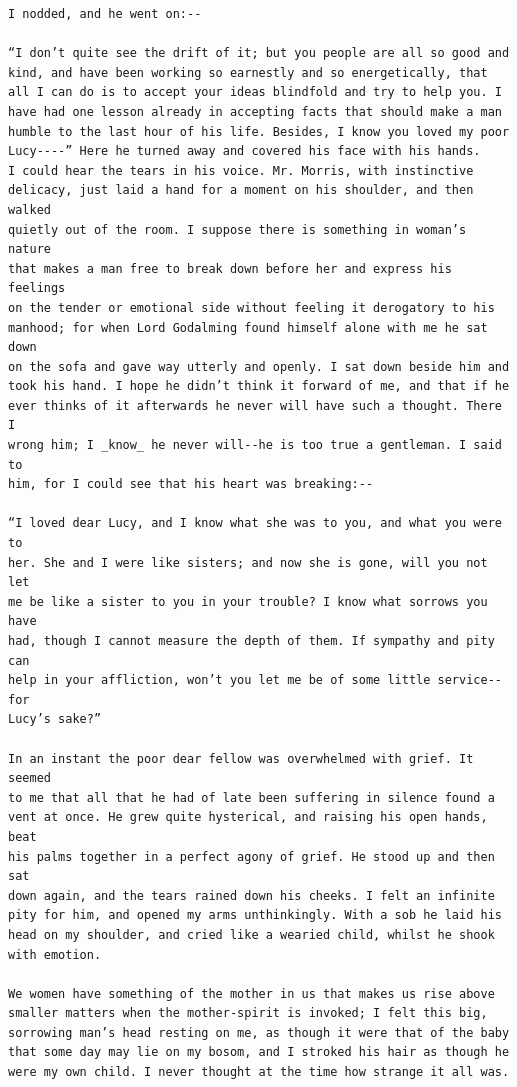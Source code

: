 \documentclass{article}
\begin{document}
\begin{verbatim}
I nodded, and he went on:--

“I don’t quite see the drift of it; but you people are all so good and
kind, and have been working so earnestly and so energetically, that
all I can do is to accept your ideas blindfold and try to help you. I
have had one lesson already in accepting facts that should make a man
humble to the last hour of his life. Besides, I know you loved my poor
Lucy----” Here he turned away and covered his face with his hands.
I could hear the tears in his voice. Mr. Morris, with instinctive
delicacy, just laid a hand for a moment on his shoulder, and then walked
quietly out of the room. I suppose there is something in woman’s nature
that makes a man free to break down before her and express his feelings
on the tender or emotional side without feeling it derogatory to his
manhood; for when Lord Godalming found himself alone with me he sat down
on the sofa and gave way utterly and openly. I sat down beside him and
took his hand. I hope he didn’t think it forward of me, and that if he
ever thinks of it afterwards he never will have such a thought. There I
wrong him; I _know_ he never will--he is too true a gentleman. I said to
him, for I could see that his heart was breaking:--

“I loved dear Lucy, and I know what she was to you, and what you were to
her. She and I were like sisters; and now she is gone, will you not let
me be like a sister to you in your trouble? I know what sorrows you have
had, though I cannot measure the depth of them. If sympathy and pity can
help in your affliction, won’t you let me be of some little service--for
Lucy’s sake?”

In an instant the poor dear fellow was overwhelmed with grief. It seemed
to me that all that he had of late been suffering in silence found a
vent at once. He grew quite hysterical, and raising his open hands, beat
his palms together in a perfect agony of grief. He stood up and then sat
down again, and the tears rained down his cheeks. I felt an infinite
pity for him, and opened my arms unthinkingly. With a sob he laid his
head on my shoulder, and cried like a wearied child, whilst he shook
with emotion.

We women have something of the mother in us that makes us rise above
smaller matters when the mother-spirit is invoked; I felt this big,
sorrowing man’s head resting on me, as though it were that of the baby
that some day may lie on my bosom, and I stroked his hair as though he
were my own child. I never thought at the time how strange it all was.


\end{verbatim}
\end{document}
